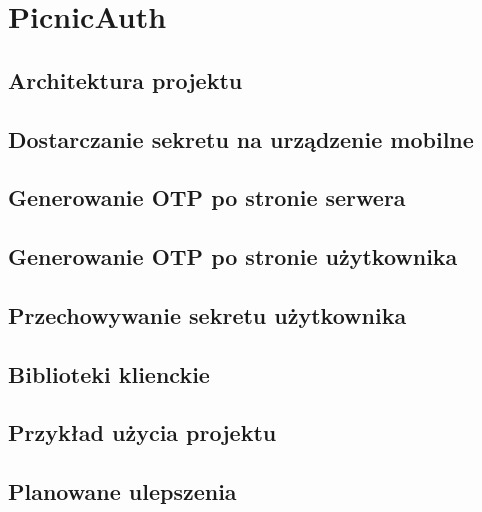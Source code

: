 \chapter{PicnicAuth}

\section{Architektura projektu}
\section{Dostarczanie sekretu na urządzenie mobilne}
\section{Generowanie OTP po stronie serwera}
\section{Generowanie OTP po stronie użytkownika}


\section{Przechowywanie sekretu użytkownika}
\section{Biblioteki klienckie}
\section{Przykład użycia projektu}
\section{Planowane ulepszenia}

